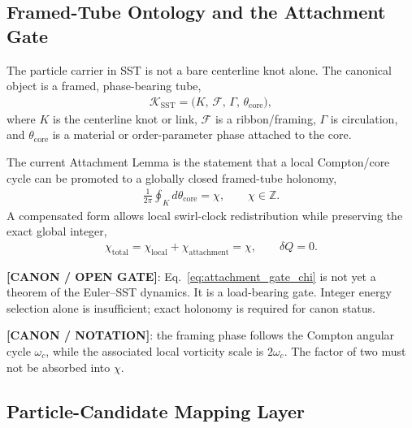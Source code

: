 
    \subsection{Framed-Tube Ontology and the Attachment Gate}
        \label{subsec:framed_tube_attachment_gate}

        The particle carrier in SST is not a bare centerline knot alone. The canonical object is a framed, phase-bearing tube,
        \begin{align}
            \mathcal{K}_{\mathrm{SST}}
            =
            \big(K,\,\mathcal{F},\,\Gamma,\,\theta_{\mathrm{core}}\big),
        \end{align}
        where $K$ is the centerline knot or link, $\mathcal{F}$ is a ribbon/framing, $\Gamma$ is circulation, and $\theta_{\mathrm{core}}$ is a material or order-parameter phase attached to the core.

        The current Attachment Lemma is the statement that a local Compton/core cycle can be promoted to a globally closed framed-tube holonomy,
        \begin{align}
            \frac{1}{2\pi}\oint_K d\theta_{\mathrm{core}}
            = \chi,
            \qquad
            \chi\in\mathbb{Z}.
            \label{eq:attachment_gate_chi}
        \end{align}
        A compensated form allows local swirl-clock redistribution while preserving the exact global integer,
        \begin{align}
            \chi_{\mathrm{total}}
            =
            \chi_{\mathrm{local}}+\chi_{\mathrm{attachment}}
            = \chi,
            \qquad
            \delta Q=0.
            \label{eq:compensated_attachment_gate}
        \end{align}

        \textbf{[CANON / OPEN GATE]}: Eq.~\eqref{eq:attachment_gate_chi} is not yet a theorem of the Euler--SST dynamics. It is a load-bearing gate. Integer energy selection alone is insufficient; exact holonomy is required for canon status.

        \textbf{[CANON / NOTATION]}: the framing phase follows the Compton angular cycle $\omega_c$, while the associated local vorticity scale is $2\omega_c$. The factor of two must not be absorbed into $\chi$.


    \subsection{Particle-Candidate Mapping Layer}
        \label{subsec:integration_knotmap}


